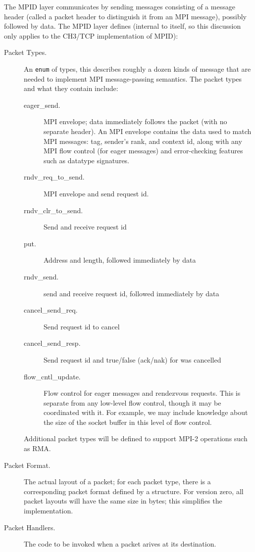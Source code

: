\documentclass{article}
\def\code{\begingroup\makeustext\eatcode}
\def\eatcode#1{\texttt{#1}\endgroup}
\begin{document}
The MPID layer communicates by sending messages consisting of a message header
(called a packet header to distinguish it from an MPI message), possibly
followed by data.  The MPID layer defines (internal to itself, so this
discussion only applies to the CH3/TCP implementation of MPID):
\begin{description}
\item[Packet Types.]An \code{enum} of types, this describes roughly a
dozen kinds of 
  message that are needed to implement MPI message-passing semantics.  The
  packet types and what they contain include:
  \begin{description}
    \item[eager\_send.] MPI envelope; data immediately follows the packet (with
      no separate header).  An MPI envelope contains the data used to match
      MPI messages: tag, sender's rank, and context id, along with any MPI 
      flow control (for eager messages) and error-checking features such as
      datatype signatures.
    \item[rndv\_req\_to\_send.]MPI envelope and send request id.
    \item[rndv\_clr\_to\_send.]Send and receive request id
    \item[put.]Address and length, followed immediately by data
    \item[rndv\_send.]send and receive request id, followed immediately by data
    \item[cancel\_send\_req.]Send request id to cancel
    \item[cancel\_send\_resp.]Send request id and true/false (ack/nak) for was
	 cancelled
    \item[flow\_cntl\_update.]Flow control for eager messages and rendezvous
      requests.  This is separate from any low-level flow control, though it
      may be coordinated with it.  For example, we may include knowledge about
      the size of the socket buffer in this level of flow control.
    \end{description}
    Additional packet types will be defined to support MPI-2 operations such
    as RMA.
\item[Packet Format.]The actual layout of a packet; for each packet type, there
  is a corresponding packet format defined by a structure.  For version zero,
  all packet layouts will have the same size in bytes; this simplifies
  the implementation.
\item[Packet Handlers.]The code to be invoked when a packet arives at its
  destination. 
\end{description}
\end{document}
